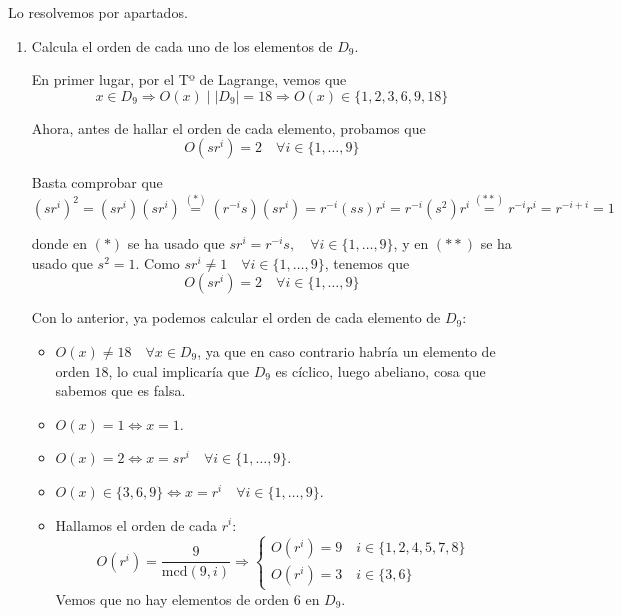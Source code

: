 \documentclass[12pt]{article}
\begin{document}
    \begin{ejercicio}
        Lo resolvemos por apartados.
        \begin{enumerate}[label=(\alph*)]
            \item Calcula el orden de cada uno de los elementos de $D_9$.
            
            En primer lugar, por el Tº de Lagrange, vemos que $$x \in D_9 \Longrightarrow O(x) \mid |D_9| = 18 \Longrightarrow O(x) \in \{1,2,3,6,9,18\}$$

            Ahora, antes de hallar el orden de cada elemento, probamos que $$O(sr^{i}) = 2 \quad \forall i \in \{1, \ldots, 9\}$$
            
            Basta comprobar que $$(sr^i)^2 = (sr^i)(sr^i) \stackrel{(*)}{=} (r^{-i}s)(sr^i) = r^{-i}(ss)r^i = r^{-i}(s^2)r^i \stackrel{(**)}{=} r^{-i}r^{i} = r^{-i+i} = 1$$

            donde en $(*)$ se ha usado que $sr^i = r^{-i}s, \quad \forall i \in \{1, \ldots, 9\}$, y en $(**)$ se ha usado que $s^2 = 1$. Como $sr^i \neq 1 \quad \forall i \in \{1, \ldots, 9\}$, tenemos que $$O(sr^i) = 2 \quad \forall i \in \{1, \ldots, 9\}$$

            Con lo anterior, ya podemos calcular el orden de cada elemento de $D_9$:

            \begin{itemize}
                \item $O(x) \neq 18 \quad \forall x \in D_9$, ya que en caso contrario habría un elemento de orden $18$, lo cual implicaría que $D_9$ es cíclico, luego abeliano, cosa que sabemos que es falsa.
                \item $O(x) = 1 \iff x = 1$.
                \item $O(x) = 2 \iff x = sr^i \quad \forall i \in \{1, \ldots, 9\}$.
                \item $O(x) \in \{3,6,9\} \iff x = r^i \quad \forall i \in \{1, \ldots, 9\}$.
                \item Hallamos el orden de cada $r^{i}$: $$O(r^i) = \dfrac{9}{\text{mcd}(9,i)} \Longrightarrow \begin{cases}
                    O(r^i) = 9 \quad i \in \{1,2,4,5,7,8\} \\
                    O(r^i) = 3 \quad i \in \{3,6\}
                \end{cases}$$
                Vemos que no hay elementos de orden $6$ en $D_9$.
            \end{itemize}


\end{enumerate}
\end{ejercicio}
\end{document}
